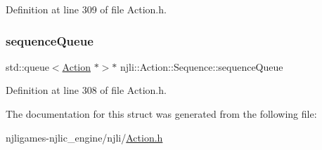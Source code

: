 Definition at line 309 of file Action.\+h.

\mbox{\label{structnjli_1_1_action_1_1_sequence_a58e1fef231bba3b8b0f2a679cd0e6abf}} 
\subsubsection{\texorpdfstring{sequence\+Queue}{sequenceQueue}}
{\footnotesize\ttfamily std\+::queue$<$\mbox{\hyperlink{classnjli_1_1_action}{Action}} $\ast$$>$$\ast$ njli\+::\+Action\+::\+Sequence\+::sequence\+Queue}



Definition at line 308 of file Action.\+h.



The documentation for this struct was generated from the following file\+:\begin{DoxyCompactItemize}
\item 
njligames-\/njlic\+\_\+engine/njli/\mbox{\hyperlink{_action_8h}{Action.\+h}}\end{DoxyCompactItemize}
